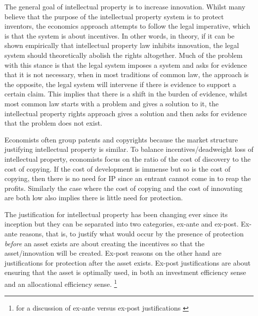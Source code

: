 \documentclass[12pt]{article}
\numberwithin{equation}{section}
\begin{document}
The general goal of intellectual property is to increase innovation. Whilst many believe that the purpose of the intellectual property system is to protect inventors, the economics approach attempts to follow the legal imperative, which is that the system is about incentives. In other words, in theory, if it can be shown empirically that intellectual property law inhibits innovation, the legal system should theoretically abolish the rights altogether. Much of the problem with this stance is that the legal system imposes a system and asks for evidence that it is not necessary, when in most traditions of common law, the approach is the opposite, the legal system will intervene if there is evidence to support a certain claim. This implies that there is a shift in the burden of evidence, whilst most common law starts with a problem and gives a solution to it, the intellectual property rights approach gives a solution and then asks for evidence that the problem does not exist.

Economists often group patents and copyrights because the market structure justifying intellectual property is similar. To balance incentives/deadweight loss of intellectual property, economists focus on the ratio of the cost of discovery to the cost of copying. If the cost of development is immense but so is the cost of copying, then there is no need for IP since an entrant cannot come in to reap the profits. Similarly the case where the cost of copying and the cost of innovating are both low also implies there is little need for protection.


The justification for intellectual property has been changing ever since its inception but they can be separated into two categories, ex-ante and ex-post. Ex-ante reasons, that is, to justify what would occur by the presence of protection \textit{before} an asset exists are about creating the incentives so that the asset/innovation will be created. Ex-post reasons on the other hand are justifications for protection after the asset exists. Ex-post justifications are about ensuring that the asset is optimally used, in both an investment efficiency sense and an allocational efficiency sense. \footnote{for a discussion of ex-ante versus ex-post justifications \cite{Lemleyt2004}}
\end{document}
